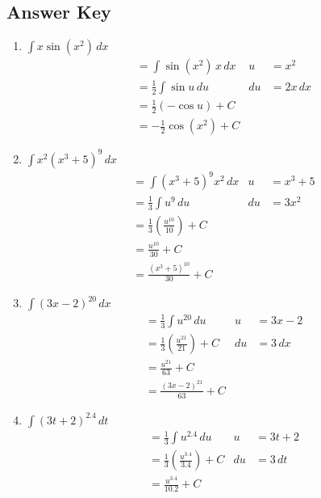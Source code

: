 \documentclass[12pt]{article}
\newcommand{\mins}{-}
\newcommand{\inline}[1]{\({#1}\)}
\begin{document}
\newpage\subsection*{Answer Key}
    \begin{enumerate}
        \item \inline{\int{} x \sin{(x^2)} \, dx}
        \begin{align*}
            &= \int{} \sin{(x^2)} \, x \, dx                        & u &= x^2 \\
            &= \frac{1}{2} \int{} \sin{u} \, du                     & du &= 2x \, dx \\
            &= \frac{1}{2} \left(\mins{} \cos{u}\right) + C \\
            &= \mins{} \frac{1}{2} \cos{(x^2)} + C
        \end{align*}

        \item \inline{\int{} x^2 {(x^3 + 5)}^9 \, dx}
        \begin{align*}
            &= \int{} {(x^3 + 5)}^9 x^2 \, dx                       & u &= x^3 + 5 \\
            &= \frac{1}{3} \int{} u^9 \, du                         & du &= 3x^2 \\
            &= \frac{1}{3} \left(\frac{u^{10}}{10}\right) + C \\
            &= \frac{u^{10}}{30} + C \\
            &= \frac{{(x^3 + 5)}^{10}}{30} + C
        \end{align*}

        \item \inline{\int{} {(3x \mins{} 2)}^{20} \, dx}
        \begin{align*}
            &= \frac{1}{3} \int{} u^{20} \, du                      & u &= 3x \mins{} 2 \\
            &= \frac{1}{3} \left(\frac{u^{21}}{21}\right) + C       & du &= 3 \, dx \\
            &= \frac{u^{21}}{63} + C \\
            &= \frac{{(3x \mins{} 2)}^{21}}{63} + C
        \end{align*}

        \newpage\item \inline{\int{} {(3t + 2)}^{2.4} \, dt}
        \begin{align*}
            &= \frac{1}{3} \int{} u^{2.4} \, du                     & u &= 3t + 2 \\
            &= \frac{1}{3} \left(\frac{u^{3.4}}{3.4}\right) + C     & du &= 3 \, dt \\
            &= \frac{u^{3.4}}{10.2} + C    
        \end{align*}


\end{enumerate}
\end{document}

